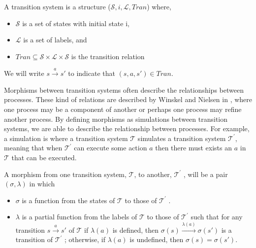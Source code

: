     \begin{definition}\label{def:transition-system}
        A transition system is a structure ($\mathcal{S}, i, \mathcal{L}, Tran$) where,
        \begin{itemize}
            \item $\mathcal{S}$ is a set of states with initial state i,
            \item $\mathcal{L}$ is a set of labels, and
            \item $Tran \subseteq \mathcal{S} \times \mathcal{L} \times \mathcal{S}$ is the transition relation
        \end{itemize}
    \end{definition}
    
    We will write $s \xrightarrow{a} s'$ to indicate  that $(s,a,s') \in Tran$.
    
    Morphisms between transition systems often describe the relationships between processes. These kind of relations are described by Winskel and Nielsen in \cite{winskel95modelsCategory}, where one process may be a component of another or perhaps one process may refine another process. By defining morphisms as simulations between transition systems, we are able to describe the relationship between processes. For example, a simulation is where a transition system $\mathcal{T}$ simulates a transition system $\mathcal{T}^{'}$, meaning that when $\mathcal{T}^{'}$ can execute some action $a$ then there must exists an $a$ in $\mathcal{T}$ that can be executed.
    
    \begin{definition}\label{def:morphism-of-transition-system}
        A morphism from one transition system, $\mathcal{T}$, to another, $\mathcal{T}^{'}$ , will be a pair $(\sigma, \lambda)$ in which
        \begin{itemize}
            \item $\sigma$ is a function from the states of $\mathcal{T}$ to those of $\mathcal{T}^{'}$ .
            \item $\lambda$ is a partial function from the labels of $\mathcal{T}$ to those of $\mathcal{T}^{'}$ such that for any transition $s \xrightarrow{a} s'$ of $\mathcal{T}$ if $\lambda(a)$ is defined, then $\sigma(s) \xrightarrow{\lambda(a)} \sigma(s')$ is a transition of $\mathcal{T}^{'}$ ; otherwise, if $\lambda(a)$ is undefined, then $\sigma(s) = \sigma(s')$.
        \end{itemize}
    \end{definition}
    
